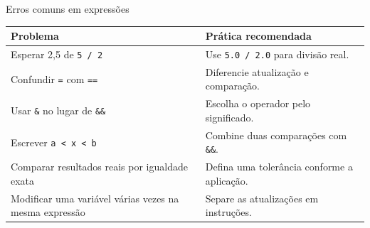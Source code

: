 \begin{frame}{Erros comuns em expressões}
\small
\begin{tabularx}{\textwidth}{>{\raggedright\arraybackslash}X>{\raggedright\arraybackslash}X}
\toprule
Problema & Prática recomendada \\
\midrule
Esperar 2,5 de \texttt{5 / 2} & Use \texttt{5.0 / 2.0} para divisão real. \\
Confundir \texttt{=} com \texttt{==} & Diferencie atualização e comparação. \\
Usar \texttt{\&} no lugar de \texttt{\&\&} & Escolha o operador pelo significado. \\
Escrever \texttt{a < x < b} & Combine duas comparações com \texttt{\&\&}. \\
Comparar resultados reais por igualdade exata & Defina uma tolerância conforme a aplicação. \\
Modificar uma variável várias vezes na mesma expressão & Separe as atualizações em instruções. \\
\bottomrule
\end{tabularx}
\end{frame}
